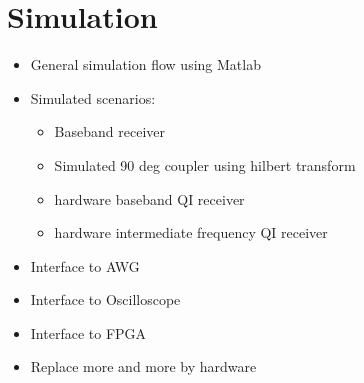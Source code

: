 \section{Simulation}
\begin{itemize}
\item General simulation flow using Matlab
\item Simulated scenarios:
  \begin{itemize}
  \item Baseband receiver
  \item Simulated 90 deg coupler using hilbert transform
  \item hardware baseband QI receiver
  \item hardware intermediate frequency QI receiver
  \end{itemize}
\item Interface to AWG
\item Interface to Oscilloscope
\item Interface to FPGA
\item Replace more and more by hardware
\end{itemize}

